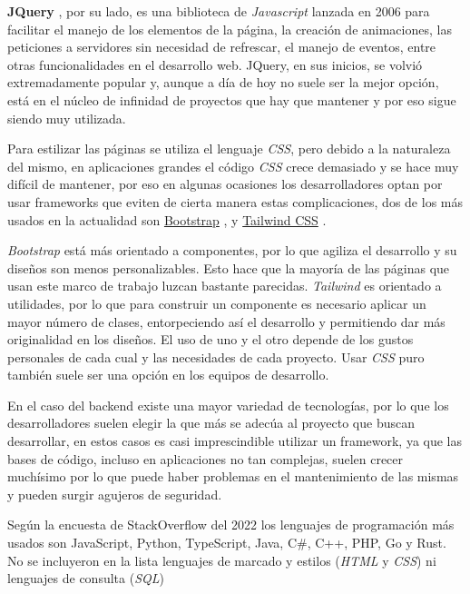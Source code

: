 \textbf{JQuery} \cite{jquery}, por su lado, es una biblioteca de \textit{Javascript} lanzada en 2006 para facilitar el manejo de los elementos de la página, la creación de animaciones, las peticiones a servidores sin necesidad de refrescar, el manejo de eventos, entre otras funcionalidades en el desarrollo web. JQuery, en sus inicios, se volvió extremadamente popular y, aunque a día de hoy no suele ser la mejor opción, está en el núcleo de infinidad de proyectos que hay que mantener y por eso sigue siendo muy utilizada.
\newline

Para estilizar las páginas se utiliza el lenguaje \textit{CSS}, pero debido a la naturaleza del mismo, en aplicaciones grandes el código \textit{CSS} crece demasiado y se hace muy difícil de mantener, por eso en algunas ocasiones los desarrolladores optan por usar frameworks que eviten de cierta manera estas complicaciones, dos de los más usados en la actualidad son \href{getbootstrap.com}{Bootstrap} \cite{bootstrap}, y \href{tailwindcss.com}{Tailwind CSS} \cite{tailwind}.
\newline

\textit{Bootstrap} está más orientado a componentes, por lo que agiliza el desarrollo y su diseños son menos personalizables. Esto hace que la mayoría de las páginas que usan este marco de trabajo luzcan bastante parecidas. \textit{Tailwind} es orientado a utilidades, por lo que para construir un componente es necesario aplicar un mayor número de clases, entorpeciendo así el desarrollo y permitiendo dar más originalidad en los diseños. El uso de uno y el otro depende de los gustos personales de cada cual y las necesidades de cada proyecto. Usar \textit{CSS} puro también suele ser una opción en los equipos de desarrollo.
\newline

En el caso del backend existe una mayor variedad de tecnologías, por lo que los desarrolladores suelen elegir la que más se adecúa al proyecto que buscan desarrollar, en estos casos es casi imprescindible utilizar un framework, ya que las bases de código, incluso en aplicaciones no tan complejas, suelen crecer muchísimo por lo que puede haber problemas en el mantenimiento de las mismas y pueden surgir agujeros de seguridad.
\newline

Según la encuesta de StackOverflow del 2022 \cite{encuesta2022} los lenguajes de programación más usados son
	 JavaScript,
	 Python,
	 TypeScript,
	 Java,
	 C\#,
	 C++,
	 PHP,
	 Go y
	 Rust.
No se incluyeron en la lista lenguajes de marcado y estilos (\textit{HTML} y \textit{CSS}) ni lenguajes de consulta (\textit{SQL})
\newline

